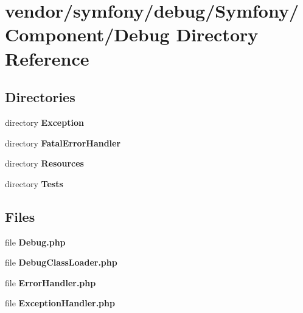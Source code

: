 \section{vendor/symfony/debug/\+Symfony/\+Component/\+Debug Directory Reference}
\label{dir_6e6770e4cfb3091aca658b311b6f748e}
\subsection*{Directories}
\begin{DoxyCompactItemize}
\item 
directory {\bf Exception}
\item 
directory {\bf Fatal\+Error\+Handler}
\item 
directory {\bf Resources}
\item 
directory {\bf Tests}
\end{DoxyCompactItemize}
\subsection*{Files}
\begin{DoxyCompactItemize}
\item 
file {\bf Debug.\+php}
\item 
file {\bf Debug\+Class\+Loader.\+php}
\item 
file {\bf Error\+Handler.\+php}
\item 
file {\bf Exception\+Handler.\+php}
\end{DoxyCompactItemize}
